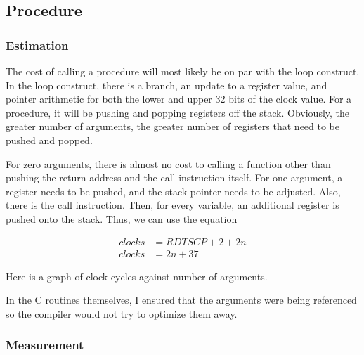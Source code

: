 \documentclass[paper=a4, fontsize=11pt]{scrartcl}
\numberwithin{equation}{section}        %
\numberwithin{figure}{section}          %
\numberwithin{table}{section}               %
\begin{document}
\subsection{Procedure}

\subsubsection{Estimation}

The cost of calling a procedure will most likely be on par with the loop construct.  In the loop construct, there is a branch, an update to a register value, and pointer arithmetic for both the lower and upper 32 bits of the clock value.  For a procedure, it will be pushing and popping registers off the stack.  Obviously, the greater number of arguments, the greater number of registers that need to be pushed and popped.

For zero arguments, there is almost no cost to calling a function other than pushing the return address and the call instruction itself.  For one argument, a register needs to be pushed, and the stack pointer needs to be adjusted.   Also, there is the call instruction. Then, for every variable, an additional register is pushed onto the stack.  Thus, we can use the equation

\begin{align}
clocks& =RDTSCP + 2 + 2n\\
clocks& =2n + 37
\end{align}

Here is a graph of clock cycles against number of arguments.

\begin{center}
\end{center}

In the C routines themselves, I ensured that the arguments were being referenced so the compiler would not try to optimize them away.

\subsubsection{Measurement}
\end{document}
